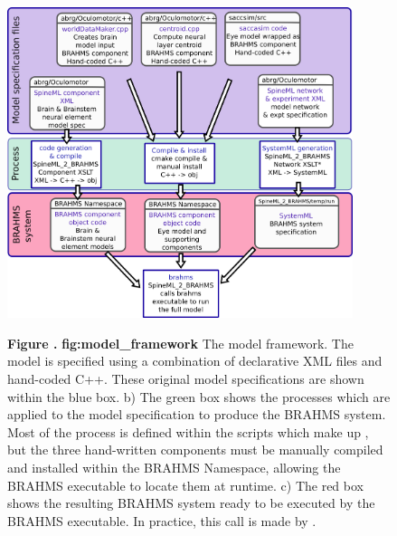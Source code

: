 \documentclass{frontiersSCNS}
\begin{document}
\begin{figure}[h!]
\begin{center}
\includegraphics[width=0.9\textwidth]{./figures/model_framework.png}
\end{center}
\textbf{\label{fig:model_framework} Figure .}
{ \textbf{fig:model\_framework} The model framework. The model is specified using a combination of
declarative XML files and hand-coded C++. These original model
specifications are shown within the blue box. b) The green box shows
the processes which are applied to the model specification to produce
the BRAHMS system. Most of the process is defined within the scripts
which make up \stob, but the three hand-written components must be
manually compiled and installed within the BRAHMS Namespace, allowing
the BRAHMS executable to locate them at runtime. c) The red box shows
the resulting BRAHMS system ready to be executed by the BRAHMS
executable. In practice, this call is made by \stob.}
\end{figure}
\end{document}
